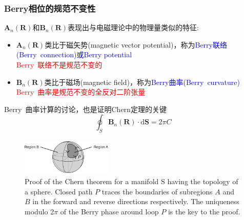 \frame
{
	\frametitle{\rm{Berry}相位的规范不变性}
	$\mathbf{A}_n(\mathbf{R})$和$\mathbf{B}_n(\mathbf{R})$表现出与电磁理论中的物理量类似的特征:
	\begin{itemize}
		\item $\mathbf{A}_n(\mathbf{R})$类比于磁矢势\textrm{(magnetic vector potential)}，称为\textcolor{blue}{\textrm{Berry}联络\textrm{(Berry~connection)}或\textrm{Berry potential}}\\
			\textcolor{red}{\textrm{Berry~}联络不是规范不变的}
		\item $\mathbf{B}_n(\mathbf{R})$类比于磁场\textrm{(magnetic field)}，称为\textcolor{blue}{\textrm{Berry}曲率\textrm{(Berry~curvature)}}\\
			\textcolor{red}{\textrm{Berry~}曲率是规范不变的全反对二阶张量}
	\end{itemize}
	{\tiny \textrm{Berry~}曲率计算的讨论，也是证明\textrm{Chern}定理的关键
	\begin{displaymath}
		\oint_S\mathbf{B}_n(\mathbf{R})\cdot\mathrm{d}\mathbf{S}=2\pi C 
	\end{displaymath}
\begin{figure}[h!]
\centering
\vspace*{-0.15in}
\includegraphics[height=0.7in,width=1.7in,viewport=0 0 1500 620,clip]{Figures/Berry-Phase_Chern.png}
\caption{\tiny \textrm{Proof of the Chern theorem for a manifold S having the topology of a sphere. Closed path $P$ traces the boundaries of subregions $A$ and $B$ in the forward and reverse directions respectively. The uniqueness modulo 2$π$ of the Berry phase around loop $P$ is the key to the proof.\cite{Berry-Phase}}}%
\label{Berry-Phase-Chern}
\end{figure}} 
}

